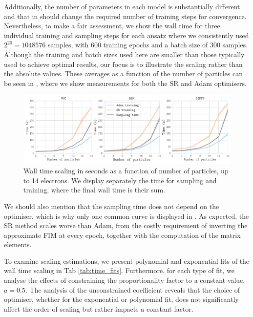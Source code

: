 Additionally, the number of parameters in each model is substantially different and that in should change the required number of training steps for convergence. Nevertheless, to make a fair assessment, we show the wall time for three individual training and sampling steps for each ansatz where we consistently used $2^{20} = 1048576$ samples, with 600 training epochs and a batch size of 300 samples. Although the training and batch sizes used here are smaller than those typically used to achieve optimal results, our focus is to illustrate the scaling rather than the absolute values. These averages as a function of the number of particles can be seen in , where we show measurements for both the SR and Adam optimisers. 

\begin{figure}[H]
    \centering
    \includegraphics[width=1\linewidth]{Chapters/Results/N2/time_scaling.pdf}
    \caption{Wall time scaling in seconds as a function of number of particles, up to 14 electrons. We display separately the time for sampling and training, where the final wall time is their sum. }
    \label{fig:time_scaling}
\end{figure}

We should also mention that the sampling time does not depend on the optimiser, which is why only one common curve is displayed in . As expected, the SR method scales worse than Adam, from the costly requirement of inverting the approximate FIM at every epoch, together with the computation of the matrix elements. 

To examine scaling estimations, we present polynomial and exponential fits of the wall time scaling in Tab \ref{tab:time_fits}. Furthermore, for each type of fit, we analyse the effects of constraining the proportionality factor to a constant value, $a = 0.5$. 
The analysis of the unconstrained coefficient reveals that the choice of optimiser, whether for the exponential or polynomial fit, does not significantly affect the order of scaling but rather impacts a constant factor. 

